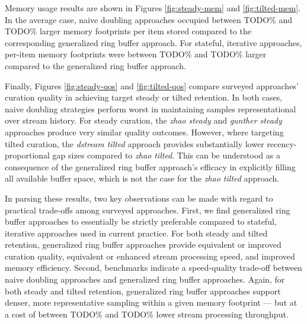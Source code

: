 


Memory usage results are shown in Figures \ref{fig:steady-mem} and \ref{fig:tilted-mem}.
In the average case, naive doubling approaches occupied between TODO\% and TODO\% larger memory footprints per item stored compared to the corresponding generalized ring buffer approach.
For stateful, iterative approaches, per-item memory footprints were between TODO\% and TODO\% larger compared to the generalized ring buffer approach.




Finally, Figures \ref{fig:steady-qos} and \ref{fig:tilted-qos} compare surveyed approaches' curation quality in achieving target steady or tilted retention.
In both cases, naive doubling strategies perform worst in maintaining samples representational over stream history.
For steady curation, the \textit{zhao steady} and \textit{gunther steady} approaches produce very similar quality outcomes.
However, where targeting tilted curation, the \textit{dstream tilted} approach provides substantially lower recency-proportional gap sizes compared to \textit{zhao tilted}.
This can be understood as a consequence of the generalized ring buffer approach's efficacy in explicitly filling all available buffer space, which is not the case for the \textit{zhao tilted} approach.

In parsing these results, two key observations can be made with regard to practical trade-offs among surveyed approaches.
First, we find generalized ring buffer approaches to essentially be strictly preferable compared to stateful, iterative approaches used in current practice.
For both steady and tilted retention, generalized ring buffer approaches provide equivalent or improved curation quality, equivalent or enhanced stream processing speed, and improved memory efficiency.
Second, benchmarks indicate a speed-quality trade-off between naive doubling approaches and generalized ring buffer approaches.
Again, for both steady and tilted retention, generalized ring buffer approaches support denser, more representative sampling within a given memory footprint --- but at a cost of between TODO\% and TODO\% lower stream processing throughput.
